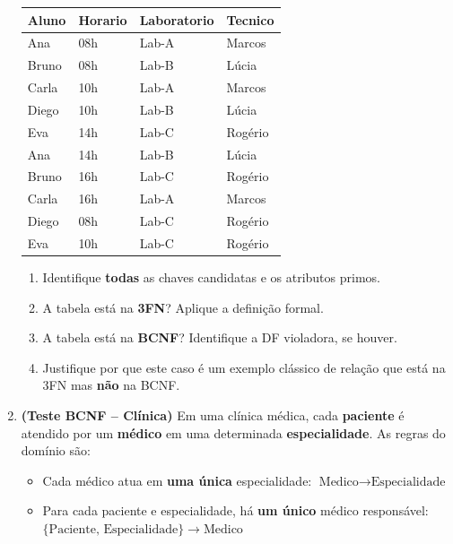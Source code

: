 \documentclass[12pt]{article}
\begin{document}
\begin{enumerate}[label=\textbf{Questão \arabic*:}, leftmargin=*]
  \vspace{0.2cm}
  \centering
  \begin{tabular}{|l|l|l|l|}
    \hline
    \textbf{Aluno} & \textbf{Horario} & \textbf{Laboratorio} & \textbf{Tecnico} \\ \hline
    Ana    & 08h & Lab-A & Marcos  \\ \hline
    Bruno  & 08h & Lab-B & Lúcia   \\ \hline
    Carla  & 10h & Lab-A & Marcos  \\ \hline
    Diego  & 10h & Lab-B & Lúcia   \\ \hline
    Eva    & 14h & Lab-C & Rogério \\ \hline
    Ana    & 14h & Lab-B & Lúcia   \\ \hline
    Bruno  & 16h & Lab-C & Rogério \\ \hline
    Carla  & 16h & Lab-A & Marcos  \\ \hline
    Diego  & 08h & Lab-C & Rogério \\ \hline
    Eva    & 10h & Lab-C & Rogério \\ \hline
  \end{tabular}
  \flushleft
  \vspace{0.2cm}
  \begin{enumerate}[label=\alph*)]
    \item Identifique \textbf{todas} as chaves candidatas e os atributos primos.
    \item A tabela está na \textbf{3FN}? Aplique a definição formal.
    \item A tabela está na \textbf{BCNF}? Identifique a DF violadora, se houver.
    \item Justifique por que este caso é um exemplo clássico de relação que está na 3FN mas \textbf{não} na BCNF.
  \end{enumerate}

  \vspace{0.4cm}

  \item \textbf{(Teste BCNF -- Clínica)} Em uma clínica médica, cada \textbf{paciente} é atendido por um \textbf{médico} em uma determinada \textbf{especialidade}. As regras do domínio são:
  \begin{itemize}
    \item Cada médico atua em \textbf{uma única} especialidade: $\text{Medico} \to \text{Especialidade}$
    \item Para cada paciente e especialidade, há \textbf{um único} médico responsável: $\{\text{Paciente, Especialidade}\} \to \text{Medico}$
  \end{itemize}


\end{enumerate}
\end{document}
